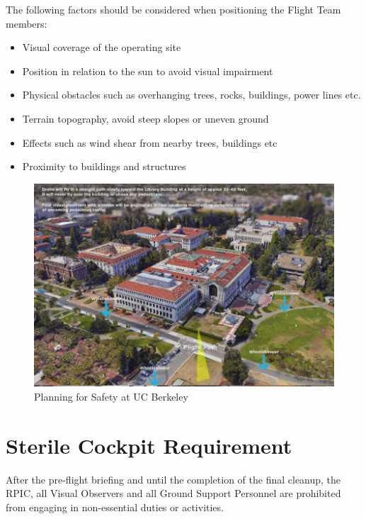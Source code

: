 \documentclass[
]{book}
\providecommand{\tightlist}{%
  \setlength{\itemsep}{0pt}\setlength{\parskip}{0pt}}
\begin{document}
The following factors should be considered when positioning the Flight Team members:

\begin{itemize}
\tightlist
\item
  Visual coverage of the operating site
\item
  Position in relation to the sun to avoid visual impairment
\item
  Physical obstacles such as overhanging trees, rocks, buildings, power lines etc.
\item
  Terrain topography, avoid steep slopes or uneven ground
\item
  Effects such as wind shear from nearby trees, buildings etc
\item
  Proximity to buildings and structures
\end{itemize}

\begin{figure}

{\centering \includegraphics[width=1\linewidth]{images/Mission_Planning_UCB} 

}

\caption{Planning for Safety at UC Berkeley}\label{fig:MP-UCB}
\end{figure}

\hypertarget{sterile-cockpit-requirement}{%
\section{Sterile Cockpit Requirement}\label{sterile-cockpit-requirement}}

After the pre-flight briefing and until the completion of the final cleanup, the RPIC, all Visual Observers and all Ground Support Personnel are prohibited from engaging in non-essential duties or activities.
\end{document}
